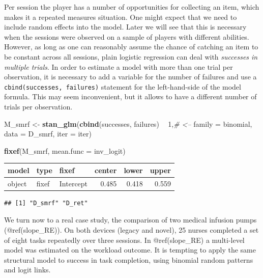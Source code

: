 \documentclass[]{svmono}
\newenvironment{Shaded}{\begin{snugshade}}{\end{snugshade}}
\newcommand{\KeywordTok}[1]{\textcolor[rgb]{0.13,0.29,0.53}{\textbf{#1}}}
\newcommand{\DataTypeTok}[1]{\textcolor[rgb]{0.13,0.29,0.53}{#1}}
\newcommand{\DecValTok}[1]{\textcolor[rgb]{0.00,0.00,0.81}{#1}}
\newcommand{\StringTok}[1]{\textcolor[rgb]{0.31,0.60,0.02}{#1}}
\newcommand{\CommentTok}[1]{\textcolor[rgb]{0.56,0.35,0.01}{\textit{#1}}}
\newcommand{\OperatorTok}[1]{\textcolor[rgb]{0.81,0.36,0.00}{\textbf{#1}}}
\newcommand{\NormalTok}[1]{#1}
\begin{document}
Per session the player has a number of opportunities for collecting an
item, which makes it a repeated measures situation. One might expect
that we need to include random effects into the model. Later we will see
that this is necessary when the sessions were observed on a sample of
players with different abilities. However, as long as one can reasonably
assume the chance of catching an item to be constant across all
sessions, plain logistic regression can deal with \emph{successes in
multiple trials}. In order to estimate a model with more than one trial
per observation, it is necessary to add a variable for the number of
failures and use a \texttt{cbind(successes,\ failures)} statement for
the left-hand-side of the model formula. This may seem inconvenient, but
it allows to have a different number of trials per observation.

\begin{Shaded}
\begin{Highlighting}[]
\NormalTok{M_smrf <-}\StringTok{ }\KeywordTok{stan_glm}\NormalTok{(}\KeywordTok{cbind}\NormalTok{(successes, failures) }\OperatorTok{~}\StringTok{ }\DecValTok{1}\NormalTok{,}\CommentTok{# <--}
                   \DataTypeTok{family =}\NormalTok{ binomial,}
                   \DataTypeTok{data =}\NormalTok{ D_smrf, }\DataTypeTok{iter =}\NormalTok{ iter)}
\end{Highlighting}
\end{Shaded}

\begin{Shaded}
\begin{Highlighting}[]
\KeywordTok{fixef}\NormalTok{(M_smrf, }\DataTypeTok{mean.func =}\NormalTok{ inv_logit)}
\end{Highlighting}
\end{Shaded}

\begin{longtable}[]{@{}lllrrr@{}}
\toprule
model & type & fixef & center & lower & upper\tabularnewline
\midrule
\endhead
object & fixef & Intercept & 0.485 & 0.418 & 0.559\tabularnewline
\bottomrule
\end{longtable}

\begin{verbatim}
## [1] "D_smrf" "D_ret"
\end{verbatim}

We turn now to a real case study, the comparison of two medical infusion
pumps (@ref(slope\_RE)). On both devices (legacy and novel), 25 nurses
completed a set of eight tasks repeatedly over three sessions. In
@ref(slope\_RE) a multi-level model was estimated on the workload
outcome. It is tempting to apply the same structural model to success in
task completion, using binomial random patterns and logit links.
\end{document}
